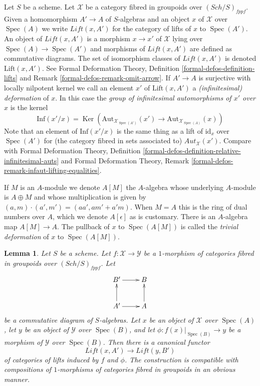 \documentclass{stacks-project}
\theoremstyle{plain}
\newtheorem{lemma}[subsection]{Lemma}
\theoremstyle{definition}
\theoremstyle{remark}
\numberwithin{equation}{subsection}
\def\Spec{\mathop{\mathrm{Spec}}}
\def\Sch{\mathit{Sch}}
\def\Ker{\mathop{\mathrm{Ker}}}
\begin{document}
\medskip\noindent
Let $S$ be a scheme. Let $\mathcal{X}$ be a category fibred in groupoids
over $(\Sch/S)_{fppf}$. Given a homomorphism $A' \to A$ of $S$-algebras
and an object $x$ of $\mathcal{X}$ over $\Spec(A)$ we write
$\textit{Lift}(x, A')$ for the category of lifts of $x$ to $\Spec(A')$.
An object of $\textit{Lift}(x, A')$ is a morphism $x \to x'$ of $\mathcal{X}$
lying over $\Spec(A) \to \Spec(A')$ and morphisms of $\textit{Lift}(x, A')$
are defined as commutative diagrams. The set of isomorphism classes of
$\textit{Lift}(x, A')$ is denoted $\text{Lift}(x, A')$. See
Formal Deformation Theory, Definition \ref{formal-defos-definition-lifts} and
Remark \ref{formal-defos-remark-omit-arrow}.
If $A' \to A$ is surjective with locally nilpotent kernel we call an element
$x'$ of $\text{Lift}(x, A')$ a {\it (infinitesimal) deformation} of $x$.
In this case the {\it group of infinitesimal automorphisms of $x'$ over $x$}
is the kernel
$$
\text{Inf}(x'/x) =
\Ker\left(
\text{Aut}_{\mathcal{X}_{\Spec(A')}}(x') \to
\text{Aut}_{\mathcal{X}_{\Spec(A)}}(x)\right)
$$
Note that an element of $\text{Inf}(x'/x)$ is the same thing as a lift
of $\text{id}_x$ over $\Spec(A')$ for (the category fibred in sets associated
to) $\mathit{Aut}_\mathcal{X}(x')$. Compare with
Formal Deformation Theory, Definition
\ref{formal-defos-definition-relative-infinitesimal-auts} and
Formal Deformation Theory, Remark
\ref{formal-defos-remark-infaut-lifting-equalities}.

\medskip\noindent
If $M$ is an $A$-module we denote $A[M]$ the $A$-algebra whose underlying
$A$-module is $A \oplus M$ and whose multiplication is given by
$(a, m) \cdot (a', m') = (aa', am' + a'm)$. When $M = A$ this is the ring
of dual numbers over $A$, which we denote $A[\epsilon]$ as is customary.
There is an $A$-algebra map $A[M] \to A$. The pullback of $x$ to $\Spec(A[M])$
is called the {\it trivial deformation} of $x$ to $\Spec(A[M])$.

\begin{lemma}
\label{lemma-functoriality}
Let $S$ be a scheme. Let $f : \mathcal{X} \to \mathcal{Y}$ be a $1$-morphism
of categories fibred in groupoids over $(\Sch/S)_{fppf}$. Let
$$
\xymatrix{
B' \ar[r] & B \\
A' \ar[u] \ar[r] & A \ar[u]
}
$$
be a commutative diagram of $S$-algebras. Let $x$ be an object of $\mathcal{X}$
over $\Spec(A)$, let $y$ be an object of $\mathcal{Y}$ over $\Spec(B)$,
and let $\phi : f(x)|_{\Spec(B)} \to y$ be a morphism of $\mathcal{Y}$
over $\Spec(B)$. Then there is a canonical functor
$$
\textit{Lift}(x, A') \longrightarrow \textit{Lift}(y, B')
$$
of categories of lifts induced by $f$ and $\phi$. The construction is
compatible with compositions of $1$-morphisms of categories fibred in
groupoids in an obvious manner.
\end{lemma}
\end{document}
